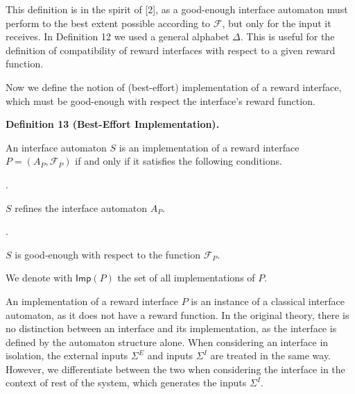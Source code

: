  
 
 
This definition is in the spirit of [2], as a good-enough interface automaton must perform to the best extent possible according to $\mathcal{F}$, but only for the input it receives. In Definition 12 we used a general alphabet $\Delta$. This is useful for the definition of compatibility of reward interfaces with respect to a given reward function.\par
 
 
 
Now we define the notion of (best-effort) implementation of a reward interface, which must be good-enough with respect the interface’s reward function.\par
 
 
 
\par\medskip\noindent\textbf{Definition 13 (Best-Effort Implementation).}\par
 
 
An interface automaton $S$ is an implementation of a reward interface $P=(A_{P},\mathcal{F}_{P})$ if and only if it satisfies the following conditions.\par
  
\par{}. 
 
$S$ refines the interface automaton $A_{P}$.\par
 
 
 
\par{}. 
 
$S$ is good-enough with respect to the function $\mathcal{F}_{P}$.\par
 
 
  
We denote with $\mathsf{Imp}(P)$ the set of all implementations of $P$.\par
 
 
 
 
An implementation of a reward interface $P$ is an instance of a classical interface automaton, as it does not have a reward function. In the original theory, there is no distinction between an interface and its implementation, as the interface is defined by the automaton structure alone. When considering an interface in isolation, the external inputs $\Sigma^{E}$ and inputs $\Sigma^{I}$ are treated in the same way. However, we differentiate between the two when considering the interface in the context of rest of the system, which generates the inputs $\Sigma^{I}$.\par
 
